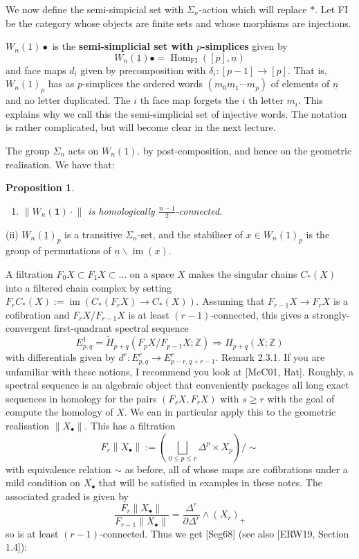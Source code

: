 \documentclass{book}
\newtheorem{prop}{Proposition}
\begin{document}
We now define the semi-simpicial set with $\Sigma_n$-action which will replace $*$. Let FI be the category whose objects are finite sets and whose morphisms are injections.

$W_n(1) \bullet$ is the \textbf{semi-simplicial set with $p$-simplices} given by
$$
W_n(\underline{1}) \bullet=\operatorname{Hom}_{\mathrm{FI}}([p], \underline{n})
$$
and face maps $d_i$ given by precomposition with $\delta_i:[p-1] \rightarrow[p]$.
That is, $W_n(1)_p$ has as $p$-simplices the ordered words $\left(m_0 m_1 \cdots m_p\right)$ of elements of $\underline{n}$ and no letter duplicated. The $i$ th face map forgets the $i$ th letter $m_i$. This explains why we call this the semi-simplicial set of injective words. The notation is rather complicated, but will become clear in the next lecture.

The group $\Sigma_n$ acts on $W_n(1)$. by post-composition, and hence on the geometric realisation. We have that:

\begin{prop}
    \begin{enumerate}
        \item $\left\|W_n(\mathbf{1}) \cdot\right\|$ is homologically $\frac{n-1}{2}$-connected.
    \end{enumerate}
\end{prop}
(ii) $W_n(\underline{1})_p$ is a transitive $\Sigma_n$-set, and the stabiliser of $x \in W_n(1)_p$ is the group of permutations of $\underline{n} \backslash \operatorname{im}(x)$.


A filtration $F_0 X \subset F_1 X \subset \ldots$ on a space $X$ makes the singular chains $C_*(X)$ into a filtered chain complex by setting $F_r C_*(X):=\operatorname{im}\left(C_*\left(F_r X\right) \rightarrow C_*(X)\right)$. Assuming that $F_{r-1} X \rightarrow F_r X$ is a cofibration and $F_r X / F_{r-1} X$ is at least $(r-1)$-connected, this gives a strongly-convergent first-quadrant spectral sequence
$$
E_{p, q}^1=\widetilde{H}_{p+q}\left(F_p X / F_{p-1} X ; \mathbb{Z}\right) \Longrightarrow H_{p+q}(X ; \mathbb{Z})
$$
with differentials given by $d^r: E_{p, q}^r \rightarrow E_{p-r, q+r-1}^r$.
Remark 2.3.1. If you are unfamiliar with these notions, I recommend you look at [McC01, Hat]. Roughly, a spectral sequence is an algebraic object that conveniently packages all long exact sequences in homology for the pairs $\left(F_s X, F_r X\right)$ with $s \geq r$ with the goal of compute the homology of $X$.
We can in particular apply this to the geometric realisation $\left\|X_{\bullet}\right\|$. This has a filtration
$$
F_r\left\|X_{\bullet}\right\|:=\left(\bigsqcup_{0 \leq p \leq r} \Delta^p \times X_p\right) / \sim
$$
with equivalence relation $\sim$ as before, all of whose maps are cofibrations under a mild condition on $X_{\bullet}$ that will be satisfied in examples in these notes. The associated graded is given by
$$
\frac{F_r\left\|X_{\bullet}\right\|}{F_{r-1}\left\|X_{\bullet}\right\|}=\frac{\Delta^r}{\partial \Delta^r} \wedge\left(X_r\right)_{+}
$$
so is at least $(r-1)$-connected. Thus we get [Seg68] (see also [ERW19, Section 1.4]):
\end{document}
